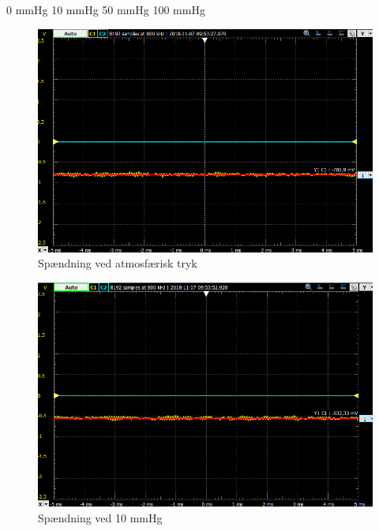 0 mmHg
10 mmHg
50 mmHg
100 mmHg

\begin{figure}[h!]
	\centering
	\includegraphics[width=1\linewidth]{Hardware/0mmHg}
	\caption{Spændning ved atmosfærisk tryk}
	\label{fig:0mmHg}
\end{figure}

\begin{figure}[h!]
	\centering
	\includegraphics[width=1\linewidth]{Hardware/10mmHg}
	\caption{Spændning ved 10 mmHg}
	\label{fig:10mmHg}
\end{figure}

